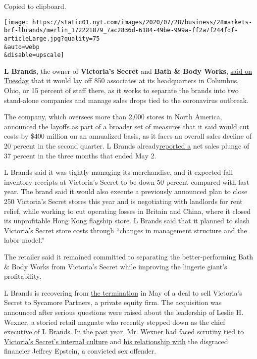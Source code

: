 Copied to clipboard.

\texttt{[image: https://static01.nyt.com/images/2020/07/28/business/28markets-brf-lbrands/merlin\_172221879\_7ac2836d-6184-49be-999a-ff2a7f244fdf-articleLarge.jpg?quality=75\\\&auto=webp\\\&disable=upscale]}

\textbf{L Brands}, the owner of \textbf{Victoria's Secret} and
\textbf{Bath \& Body Works},
\href{http://investors.lb.com/news-releases/news-release-details/l-brands-provides-update-progress-executing-go-forward-strategy}{said
on Tuesday} that it would lay off 850 associates at its headquarters in
Columbus, Ohio, or 15 percent of staff there, as it works to separate
the brands into two stand-alone companies and manage sales drops tied to
the coronavirus outbreak.

The company, which oversees more than 2,000 stores in North America,
announced the layoffs as part of a broader set of measures that it said
would cut costs by \$400 million on an annualized basis, as it faces an
overall sales decline of 20 percent in the second quarter. L Brands
already\href{https://www.nytimes.com/2020/05/20/business/coronavirus-economy-stock-market.html}{reported
a} net sales plunge of 37 percent in the three months that ended May 2.

L Brands said it was tightly managing its merchandise, and it expected
fall inventory receipts at Victoria's Secret to be down 50 percent
compared with last year. The brand said it would also execute a
previously announced plan to close 250 Victoria's Secret stores this
year and is negotiating with landlords for rent relief, while working to
cut operating losses in Britain and China, where it closed its
unprofitable Hong Kong flagship store. L Brands said that it planned to
slash Victoria's Secret store costs through ``changes in management
structure and the labor model.''

The retailer said it remained committed to separating the
better-performing Bath \& Body Works from Victoria's Secret while
improving the lingerie giant's profitability.

L Brands is recovering from
\href{https://www.nytimes.com/2020/05/04/business/coronavirus-victorias-secret-sale-falls-apart.html}{the
termination} in May of a deal to sell Victoria's Secret to Sycamore
Partners, a private equity firm. The acquisition was announced after
serious questions were raised about the leadership of Leslie H. Wexner,
a storied retail magnate who recently stepped down as the chief
executive of L Brands. In the past year, Mr. Wexner had faced scrutiny
tied to
\href{https://www.nytimes.com/2020/02/01/business/victorias-secret-razek-harassment.html}{Victoria's
Secret's internal culture} and
\href{https://www.nytimes.com/2019/07/25/business/jeffrey-epstein-wexner-victorias-secret.html}{his
relationship with} the disgraced financier Jeffrey Epstein, a convicted
sex offender.

